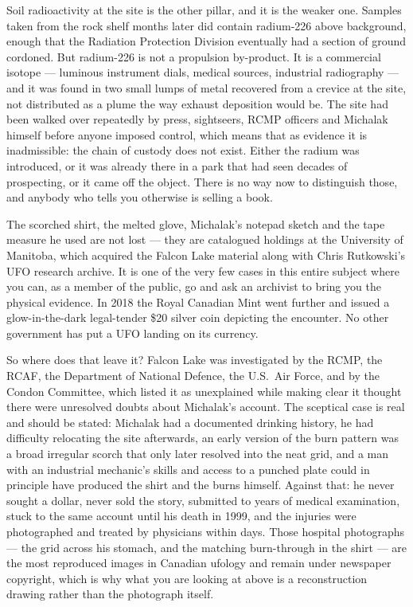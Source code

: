 Soil radioactivity at the site is the other pillar, and it is the weaker one. Samples taken from
the rock shelf months later did contain radium-226 above background, enough that the Radiation
Protection Division eventually had a section of ground cordoned. But radium-226 is not a
propulsion by-product. It is a commercial isotope --- luminous instrument dials, medical sources,
industrial radiography --- and it was found in two small lumps of metal recovered from a crevice at
the site, not distributed as a plume the way exhaust deposition would be. The site had been walked
over repeatedly by press, sightseers, RCMP officers and Michalak himself before anyone imposed
control, which means that as evidence it is inadmissible: the chain of custody does not exist.
Either the radium was introduced, or it was already there in a park that had seen decades of
prospecting, or it came off the object. There is no way now to distinguish those, and anybody who
tells you otherwise is selling a book.

\begin{funfact}
The scorched shirt, the melted glove, Michalak's notepad sketch and the tape measure he used are
not lost --- they are catalogued holdings at the University of Manitoba, which acquired the
Falcon Lake material along with Chris Rutkowski's UFO research archive. It is one of the very few
cases in this entire subject where you can, as a member of the public, go and ask an archivist to
bring you the physical evidence. In 2018 the Royal Canadian Mint went further and issued a
glow-in-the-dark legal-tender \$20 silver coin depicting the encounter. No other government has
put a UFO landing on its currency.
\end{funfact}

So where does that leave it? Falcon Lake was investigated by the RCMP, the RCAF, the Department of
National Defence, the U.S.\ Air Force, and by the Condon Committee, which listed it as unexplained
while making clear it thought there were unresolved doubts about Michalak's account. The
sceptical case is real and should be stated: Michalak had a documented drinking history, he had
difficulty relocating the site afterwards, an early version of the burn pattern was a broad
irregular scorch that only later resolved into the neat grid, and a man with an industrial
mechanic's skills and access to a punched plate could in principle have produced the shirt and the
burns himself. Against that: he never sought a dollar, never sold the story, submitted to years of
medical examination, stuck to the same account until his death in 1999, and the injuries were
photographed and treated by physicians within days. Those hospital photographs --- the grid across
his stomach, and the matching burn-through in the shirt --- are the most reproduced images in
Canadian ufology and remain under newspaper copyright, which is why what you are looking at above
is a reconstruction drawing rather than the photograph itself.

